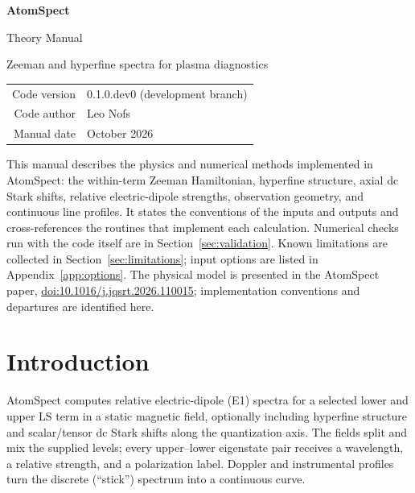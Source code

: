 \documentclass[11pt,a4paper]{article}
\newcommand{\doiurl}[1]{\href{https://doi.org/#1}{doi:#1}}
\numberwithin{equation}{section}
\begin{document}
\hypersetup{pageanchor=false}

\begin{titlepage}
\centering
\vspace*{3cm}
{\Huge\bfseries AtomSpect\par}
\vspace{0.6cm}
{\LARGE Theory Manual\par}
\vspace{0.4cm}
{\large Zeeman and hyperfine spectra for plasma diagnostics\par}
\vspace{2cm}
\begin{tabular}{rl}
Code version & 0.1.0.dev0 (development branch)\\
Code author & Leo Nofs\\
Manual date & October 2026
\end{tabular}
\vfill
\begin{minipage}{0.88\linewidth}
\raggedright\small
This manual describes the physics and numerical methods implemented in
AtomSpect: the within-term Zeeman Hamiltonian, hyperfine structure, axial dc Stark shifts,
relative electric-dipole strengths, observation geometry, and continuous
line profiles. It states the conventions of the inputs and outputs and
cross-references the routines that implement each calculation. Numerical
checks run with the code itself are in Section~\ref{sec:validation}.
Known limitations are collected in Section~\ref{sec:limitations}; input
options are listed in Appendix~\ref{app:options}. The physical model is
presented in the AtomSpect paper, \doiurl{10.1016/j.jqsrt.2026.110015};
implementation conventions and departures are identified here.
\end{minipage}
\vspace{1.5cm}
\end{titlepage}

\hypersetup{pageanchor=true}
\begingroup
\setlength{\parskip}{0pt}
\tableofcontents
\endgroup
\clearpage
{}

\section{Introduction}\label{sec:intro}

AtomSpect computes relative electric-dipole (E1) spectra for a selected
lower and upper LS term in a static magnetic field, optionally including
hyperfine structure and scalar/tensor dc Stark shifts along the quantization axis. The fields split and mix the supplied levels;
every upper--lower eigenstate pair receives a wavelength, a relative
strength, and a polarization label. Doppler and instrumental profiles
turn the discrete (``stick'') spectrum into a continuous curve.
\end{document}
